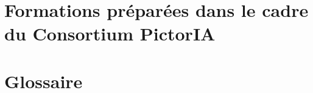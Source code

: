 

\chapter[Formations Arkindex et Callico]{Formations préparées dans le cadre du Consortium PictorIA}
\label{sec:Formations}





\backmatter %


\newpage{\pagestyle{empty}\cleardoublepage}

\cleardoublepage
{}
\listoffigures
{}


\cleardoublepage
{}
\listoftables
{}



\chapter*{Glossaire}
\label{sec:Glossaire}

\tableofcontents